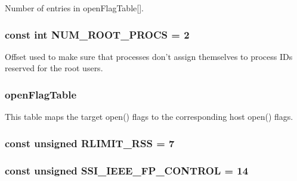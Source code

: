 Number of entries in openFlagTable\mbox{[}\mbox{]}. \hypertarget{classMipsLinux_afaeb843972161edc8d0f4a9360764877}{
\subsubsection[{NUM\_\-ROOT\_\-PROCS}]{\setlength{\rightskip}{0pt plus 5cm}const int {\bf NUM\_\-ROOT\_\-PROCS} = 2}}
\label{classMipsLinux_afaeb843972161edc8d0f4a9360764877}
Offset used to make sure that processes don't assign themselves to process IDs reserved for the root users. \hypertarget{classMipsLinux_ab1db5a531609b99b262cc849ea24765a}{
\subsubsection[{openFlagTable}]{ {\bf openFlagTable}}}
\label{classMipsLinux_ab1db5a531609b99b262cc849ea24765a}
This table maps the target open() flags to the corresponding host open() flags. \hypertarget{classMipsLinux_a9dd9669e602da0f5fa19e0e859309f24}{
\subsubsection[{RLIMIT\_\-RSS}]{\setlength{\rightskip}{0pt plus 5cm}const unsigned {\bf RLIMIT\_\-RSS} = 7}}
\label{classMipsLinux_a9dd9669e602da0f5fa19e0e859309f24}
\hypertarget{classMipsLinux_a4dea1885b08c38c78286ecd5ffd5488d}{
\subsubsection[{SSI\_\-IEEE\_\-FP\_\-CONTROL}]{\setlength{\rightskip}{0pt plus 5cm}const unsigned {\bf SSI\_\-IEEE\_\-FP\_\-CONTROL} = 14}}
\label{classMipsLinux_a4dea1885b08c38c78286ecd5ffd5488d}


